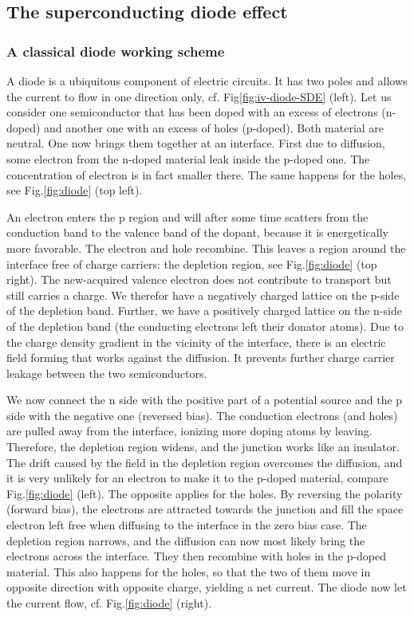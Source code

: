 \documentclass[../main.tex]{subfiles}
\begin{document}
\subsection{The superconducting diode effect}
\subsubsection{A classical diode working scheme}
    A diode is a ubiquitous component of electric circuits. It has two poles and allows the current to flow in one direction only, cf. Fig\ref{fig:iv-diode-SDE} (left). 
    Let us consider one semiconductor that has been doped with an excess of electrons (n-doped) and another one with an excess of 
    holes (p-doped). Both material are neutral. One now brings them together at an interface. First due to diffusion, some electron from the n-doped material leak
    inside the p-doped one. The concentration of electron is in fact smaller there. The same happens for the holes, see Fig.\ref{fig:diode} (top left).

    An electron enters the p region and will after some time scatters from the conduction band to the valence band of the dopant, because it is energetically more favorable. 
    The electron and hole recombine.
    This leaves a region around the interface free of charge carriers:
    the depletion region, see Fig.\ref{fig:diode} (top right). The new-acquired valence electron does not contribute to transport but
    still carries a charge. We therefor have a negatively charged lattice on the p-side of the depletion band. Further, we have a
    positively charged lattice on the n-side of the depletion band (the conducting electrons left their donator atoms). 
    Due to the charge density gradient in the vicinity of the interface, there is an electric field forming that works against the diffusion.
    It prevents further charge carrier leakage between the two semiconductors. 

    We now connect the n side with the positive part of a potential source and the p side with the negative one (reversed bias).  The conduction electrons (and holes) are
    pulled away from the interface, ionizing more doping atoms by leaving. Therefore, the depletion region widens, and the junction works like an
    insulator. The drift caused by the field in the depletion region overcomes the diffusion, and it is very unlikely for an electron to make it to the p-doped material, compare Fig.\ref{fig:diode} (left).  The opposite applies for the holes.
    By reversing the polarity (forward bias), the electrons are attracted towards the junction and fill the space electron left free when diffusing to the interface
    in the zero bias case. The depletion region narrows, and the diffusion can now most likely bring the electrons across the interface. They then recombine 
    with holes in the p-doped material. This also happens for the holes, so that the two of them move in opposite direction with opposite charge, yielding
    a net current. The diode now let the current flow, cf. Fig.\ref{fig:diode} (right).
    
\end{document}
